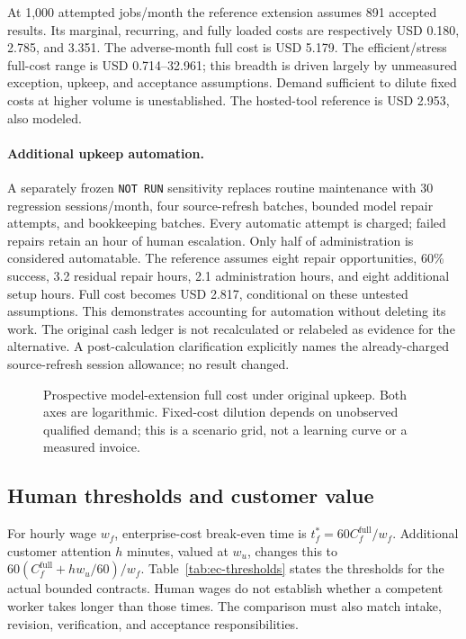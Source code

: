 At 1,000 attempted jobs/month the reference extension assumes 891 accepted
results. Its marginal, recurring, and fully loaded costs are respectively
USD 0.180, 2.785, and 3.351. The adverse-month full cost is USD 5.179.
The efficient/stress full-cost range is USD 0.714--32.961; this breadth is
driven largely by unmeasured exception, upkeep, and acceptance assumptions.
Demand sufficient to dilute fixed costs at higher volume is unestablished.
The hosted-tool reference is USD 2.953, also modeled.

\paragraph{Additional upkeep automation.}
A separately frozen \texttt{NOT RUN} sensitivity replaces routine maintenance
with 30 regression sessions/month, four source-refresh batches, bounded model
repair attempts, and bookkeeping batches. Every automatic attempt is charged;
failed repairs retain an hour of human escalation. Only half of administration
is considered automatable. The reference assumes eight repair opportunities,
60\% success, 3.2 residual repair hours, 2.1 administration hours, and eight
additional setup hours. Full cost becomes USD 2.817, conditional on these
untested assumptions. This demonstrates accounting for automation without
deleting its work. The original cash ledger is not recalculated or relabeled
as evidence for the alternative. A post-calculation clarification explicitly
names the already-charged source-refresh session allowance; no result changed.

\begin{figure}[htbp]\centering
\caption{Prospective model-extension full cost under original upkeep. Both axes are logarithmic. Fixed-cost dilution depends on unobserved qualified demand; this is a scenario grid, not a learning curve or a measured invoice.}\label{fig:costs}
\end{figure}
\subsection{Human thresholds and customer value}

For hourly wage $w_f$, enterprise-cost break-even time is
$t_f^*=60C_f^{\mathrm{full}}/w_f$. Additional customer attention $h$ minutes,
valued at $w_u$, changes this to
$60(C_f^{\mathrm{full}}+hw_u/60)/w_f$. Table~\ref{tab:ec-thresholds} states the
thresholds for the actual bounded contracts. Human wages do not establish
whether a competent worker takes longer than those times. The comparison
must also match intake, revision, verification, and acceptance responsibilities.

